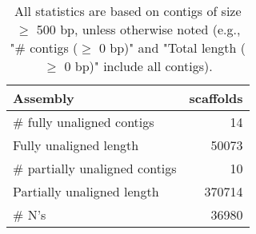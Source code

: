 \documentclass[12pt,a4paper]{article}
\begin{document}
\begin{table}[ht]
\begin{center}
\caption{All statistics are based on contigs of size $\geq$ 500 bp, unless otherwise noted (e.g., "\# contigs ($\geq$ 0 bp)" and "Total length ($\geq$ 0 bp)" include all contigs).}
\begin{tabular}{|l*{1}{|r}|}
\hline
Assembly & scaffolds \\ \hline
\# fully unaligned contigs & 14 \\ \hline
Fully unaligned length & 50073 \\ \hline
\# partially unaligned contigs & 10 \\ \hline
Partially unaligned length & 370714 \\ \hline
\# N's & 36980 \\ \hline
\end{tabular}
\end{center}
\end{table}
\end{document}
